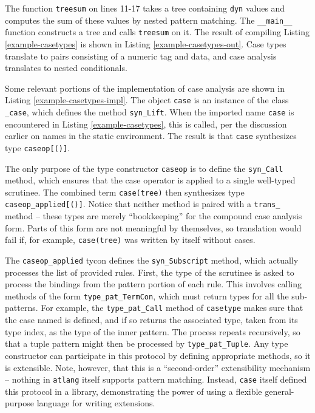 \documentclass[9pt]{sigplanconf}
\newcommand{\lstinlinep}[1]{\lstinline[language=Python,basicstyle=\ttfamily\small,deletendkeywords={tuple,buffer,map}]{#1}}
\begin{document}
The function \lstinlinep{treesum} on lines 11-17 takes a tree containing \lstinlinep{dyn} values and computes the sum of these values by nested pattern matching. The \lstinlinep{__main__} function constructs a tree and calls \lstinlinep{treesum} on it. The result of compiling Listing \ref{example-casetypes} is shown in Listing \ref{example-casetypes-out}. Case types translate to pairs consisting of a numeric tag and data, and case analysis translates to nested conditionals.

Some relevant portions of the implementation of case analysis are shown in Listing \ref{example-casetypes-impl}. The object \lstinlinep{case} is an instance of the class \lstinlinep{_case}, which defines the method \lstinlinep{syn_Lift}. When the imported name \lstinlinep{case} is encountered in Listing \ref{example-casetypes}, this is called, per the discussion earlier on names in the static environment. The result is that \lstinline{case} synthesizes type \lstinlinep{caseop[()]}.

The only purpose of the type constructor \lstinlinep{caseop} is to define the \lstinlinep{syn_Call} method, which ensures that the case operator is applied to a single well-typed scrutinee. The combined term \lstinlinep{case(tree)} then synthesizes type \lstinlinep{caseop_applied[()]}. Notice that neither method is paired with a \lstinlinep{trans_} method -- these types are merely ``bookkeeping'' for the compound case analysis form. Parts of this form are not meaningful by themselves, so translation would fail if, for example, \lstinlinep{case(tree)} was written by itself without cases.

The \lstinlinep{caseop_applied} tycon defines the \lstinlinep{syn_Subscript} method, which actually processes the list of provided rules. First, the type of the scrutinee is asked to process the bindings from the pattern portion of each rule. This involves calling methods of the form \lstinlinep{type_pat_TermCon}, which must return types for all the sub-patterns. For example, the \lstinline{type_pat_Call} method of \lstinline{casetype} makes sure that the case named is defined, and if so returns the associated type, taken from its type index, as the type of the inner pattern. The process repeats recursively, so that a tuple pattern might then be processed by \lstinlinep{type_pat_Tuple}. Any type constructor can participate in this protocol by defining appropriate methods, so it is extensible. Note, however, that this is a ``second-order'' extensibility mechanism -- nothing in \verb|atlang| itself supports pattern matching. Instead, \lstinlinep{case} itself defined this protocol in a library, demonstrating the power of using a flexible general-purpose language for writing extensions.
\end{document}
